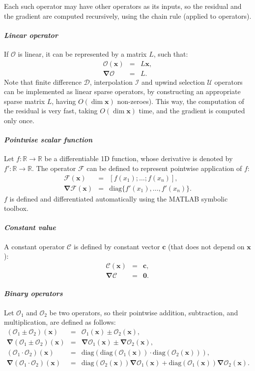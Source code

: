\documentclass[10pt]{ijnam}
\newcommand{\diag}{\ensuremath{\mathrm{diag}}}
\newcommand{\R}{\ensuremath{\mathbb{R}}}
\newcommand\bnabla{\boldsymbol{\nabla}}
\newcommand\bx{\boldsymbol{x}}
\newcommand\bc{\boldsymbol{c}}
\newcommand\bzero{\boldsymbol{0}}
\newcommand\cF{\mathcal{F}}
\newcommand\cO{\mathcal{O}}
\newcommand\cI{\mathcal{I}}
\newcommand\cD{\mathcal{D}}
\begin{document}
Each such operator may have other operators as its inputs, so the residual
and the gradient are computed recursively, using the chain rule (applied to operators).

\paragraph{\textit{Linear operator}}
If $\cO$ is linear, it can be represented by a matrix $L$, such that:
\begin{eqnarray*}
\cO(\bx) &=& L \bx, \\
\bnabla\cO &=& L. 
\end{eqnarray*}
Note that finite difference $\cD$, interpolation $\cI$ and 
upwind selection $\mathcal{U}$ operators
can be implemented as linear sparse operators, by constructing 
an appropriate sparse matrix $L$, having $O(\dim \bx)$ non-zeroes).
This way, the computation of the residual is very fast, taking $O(\dim \bx)$ time,
and the gradient is computed only once.

\paragraph{\textit{Pointwise scalar function}}
Let $f: \R \rightarrow \R$ be a differentiable 1D function, whose derivative is
denoted by $f': \R \rightarrow \R$. The operator $\cF$ can be defined to
represent pointwise application of $f$:
\begin{eqnarray*}
\cF(\bx) &=& [f(x_1); \ldots; f(x_n)], \\
\bnabla\cF(\bx) &=& \diag\{f'(x_1), \ldots, f'(x_n)\}.
\end{eqnarray*}
$f$ is defined and differentiated automatically using the MATLAB symbolic toolbox.

\paragraph{\textit{Constant value}}
A constant operator $\mathcal{C}$ is defined by constant vector $\bc$ 
(that does not depend on $\bx$):
\begin{eqnarray*}
\mathcal{C}(\bx) &=& \bc, \\
\bnabla\mathcal{C} &=& \bzero.
\end{eqnarray*}

\paragraph{\textit{Binary operators}}
Let $\cO_1$ and $\cO_2$ be two operators, so their pointwise addition, subtraction,
and multiplication, are defined as follows:
\begin{eqnarray*}
(\cO_1 \pm \cO_2)(\bx) &=& \cO_1(\bx) \pm \cO_2(\bx), \\
\bnabla (\cO_1 \pm \cO_2)(\bx)   &=& \bnabla\cO_1(\bx) \pm \bnabla\cO_2(\bx), \\
(\cO_1 \cdot \cO_2)(\bx) &=& \diag(\diag(\cO_1(\bx)) \cdot \diag(\cO_2(\bx))), \\
\bnabla (\cO_1 \cdot \cO_2)(\bx) &=& \diag(\cO_2(\bx)) \bnabla\cO_1(\bx) 
                                  + \diag(\cO_1(\bx)) \bnabla\cO_2(\bx).
\end{eqnarray*}
\end{document}
